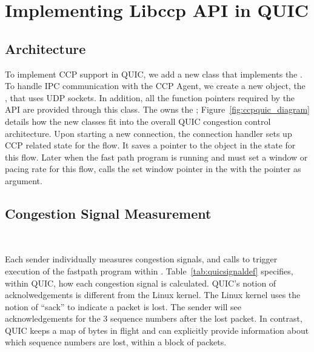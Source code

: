 \section{Implementing Libccp API in QUIC}
\subsection{Architecture}

To implement CCP support in QUIC, we add a new  class that implements the .
To handle IPC communication with the CCP Agent, we create a new object, the , that uses UDP sockets.
In addition, all the function pointers required by the \libccp API are provided through this class.
The  owns the ; Figure~\ref{fig:ccpquic_diagram} details how the new classes fit into the overall QUIC congestion control architecture.
Upon starting a new connection, the connection handler sets up CCP related state for the flow.
It saves a pointer to the  object in the \libccp state for this flow.
Later when the fast path program is running and \libccp must set a window or pacing rate for this flow, \libccp calls the set window pointer in the  with the  pointer as argument.

\subsection{Congestion Signal Measurement}\

Each sender individually measures congestion signals, and calls  to trigger execution of the fastpath program within \libccp.
Table~\ref{tab:quicsignaldef} specifies, within QUIC, how each congestion signal is calculated.
QUIC's notion of acknolwedgements is different from the Linux kernel. The Linux kernel uses the notion of ``sack'' to indicate a packet is lost.
The sender will see acknowledgements for the 3 sequence numbers after the lost packet.
In contrast, QUIC keeps a map of bytes in flight and can explicitly provide information about which sequence numbers are lost, within a block of packets.

